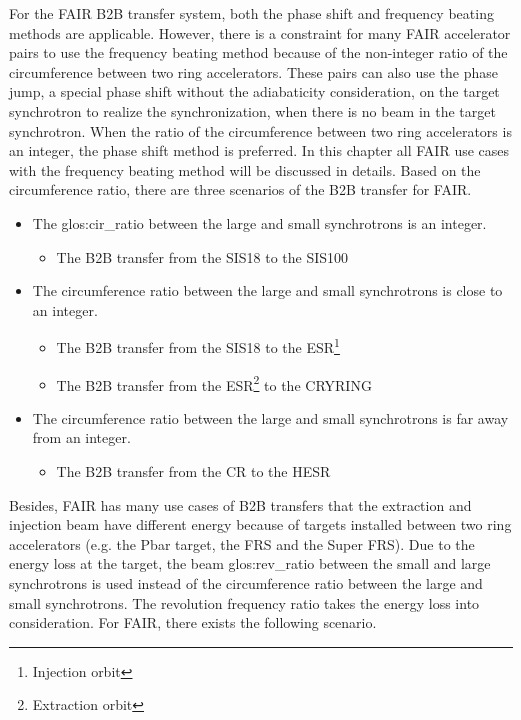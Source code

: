 For the FAIR B2B transfer system, both the phase shift and frequency beating methods are applicable. However, there is a constraint for many FAIR accelerator pairs to use the frequency beating method because of the non-integer ratio of the circumference between two ring accelerators. These pairs can also use the phase jump, a special phase shift without the adiabaticity consideration, on the target synchrotron to realize the synchronization, when there is no beam in the target synchrotron.  When the ratio of the circumference between two ring accelerators is an integer, the phase shift method is preferred. In this chapter all FAIR use cases with the frequency beating method will be discussed in details. Based on the circumference ratio, there are three scenarios of the B2B transfer for FAIR. 
\begin{itemize}
	\item The \gls{glos:cir_ratio} between the large and small synchrotrons is an integer.
		\begin{itemize}
			\item	The B2B transfer from the SIS18 to the SIS100

		\end{itemize}
	\item The circumference ratio between the large and small synchrotrons is close to an integer.
		\begin{itemize}
			\item The B2B transfer from the SIS18 to the ESR\footnote{Injection orbit}
			\item The B2B transfer from the ESR\footnote{Extraction orbit} to the CRYRING
		\end{itemize}
 	\item The circumference ratio between the large and small synchrotrons is far away from an integer.
		\begin{itemize}
			\item The B2B transfer from the CR to the HESR
		\end{itemize}
\end{itemize}
Besides, FAIR has many use cases of B2B transfers that the extraction and injection beam have different energy because of targets installed between two ring accelerators (e.g. the Pbar target, the FRS and the Super FRS). Due to the energy loss at the target, the beam \gls{glos:rev_ratio} between the small and large synchrotrons is used instead of the circumference ratio between the large and small synchrotrons. The revolution frequency ratio takes the energy loss into consideration. For FAIR, there exists the following scenario.

